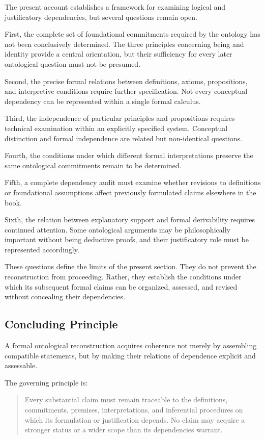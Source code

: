 The present account establishes a framework for examining
logical and justificatory dependencies, but several questions
remain open.

First, the complete set of foundational commitments required
by the ontology has not been conclusively determined. The
three principles concerning being and identity provide a
central orientation, but their sufficiency for every later
ontological question must not be presumed.

Second, the precise formal relations between definitions,
axioms, propositions, and interpretive conditions require
further specification. Not every conceptual dependency can
be represented within a single formal calculus.

Third, the independence of particular principles and
propositions requires technical examination within an
explicitly specified system. Conceptual distinction and
formal independence are related but non-identical questions.

Fourth, the conditions under which different formal
interpretations preserve the same ontological commitments
remain to be determined.

Fifth, a complete dependency audit must examine whether
revisions to definitions or foundational assumptions affect
previously formulated claims elsewhere in the book.

Sixth, the relation between explanatory support and formal
derivability requires continued attention. Some ontological
arguments may be philosophically important without being
deductive proofs, and their justificatory role must be
represented accordingly.

These questions define the limits of the present section.
They do not prevent the reconstruction from proceeding.
Rather, they establish the conditions under which its
subsequent formal claims can be organized, assessed, and
revised without concealing their dependencies.

\subsection{Concluding Principle}

A formal ontological reconstruction acquires coherence not
merely by assembling compatible statements, but by making
their relations of dependence explicit and assessable.

The governing principle is:

\begin{quote}
Every substantial claim must remain traceable to the
definitions, commitments, premises, interpretations, and
inferential procedures on which its formulation or
justification depends. No claim may acquire a stronger
status or a wider scope than its dependencies warrant.
\end{quote}

